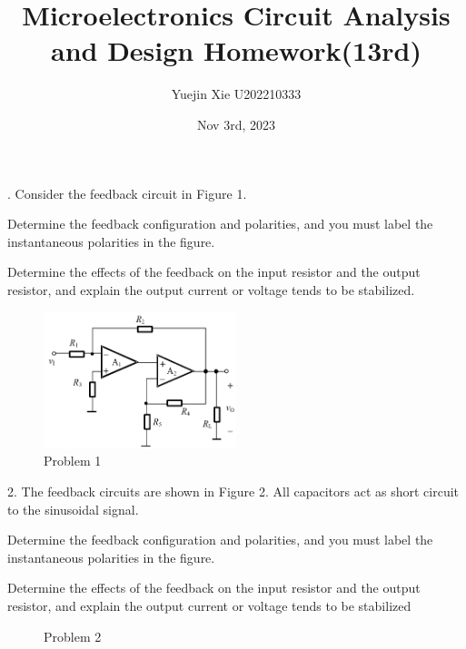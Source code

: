 \documentclass[a4paper,11pt,UTF8]{article}
\title{Microelectronics Circuit Analysis and Design Homework(13rd)}
\author{Yuejin Xie \quad U202210333}
\date{Nov 3rd, 2023}
\begin{document}
. Consider the feedback circuit in Figure 1.

 Determine the feedback configuration and polarities, and you must label the instantaneous polarities in the figure.

 Determine the effects of the feedback on the input resistor and the output resistor, and explain the output current or voltage tends to be stabilized.
\begin{figure}[H]
	\centering
	\includegraphics[width=0.5\textwidth]{12.1}
	\caption{Problem 1}
\end{figure}
2. The feedback circuits are shown in Figure 2. All capacitors act as short circuit to the sinusoidal signal.

 Determine the feedback configuration and polarities, and you must label the instantaneous polarities in the figure.

 Determine the effects of the feedback on the input resistor and the output resistor, and explain the output current or voltage tends to be stabilized
\begin{figure}[H]
	\caption{Problem 2}
\end{figure}
\end{document}
